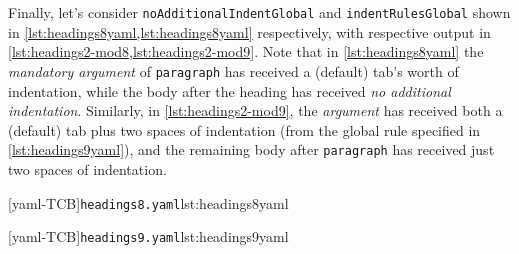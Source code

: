 	Finally, let's consider \texttt{noAdditionalIndentGlobal} and \texttt{indentRulesGlobal} shown in \cref{lst:headings8yaml,lst:headings8yaml}
	respectively, with respective output in \cref{lst:headings2-mod8,lst:headings2-mod9}. Note that in \cref{lst:headings8yaml} the
	\emph{mandatory argument} of \texttt{paragraph} has received a (default) tab's worth of indentation, while the body after the
	heading has received \emph{no additional indentation}. Similarly, in \cref{lst:headings2-mod9}, the \emph{argument} has received both a
	(default) tab plus two spaces of indentation (from the global rule specified in \cref{lst:headings9yaml}), and the remaining body
	after \texttt{paragraph} has received just two spaces of indentation.

	\begin{minipage}{.45\textwidth}
	\end{minipage}%
	\hfill
	\begin{minipage}{.45\textwidth}
		[yaml-TCB]{\texttt{headings8.yaml}}{lst:headings8yaml}
	\end{minipage}

	\begin{minipage}{.45\textwidth}
	\end{minipage}%
	\hfill
	\begin{minipage}{.45\textwidth}
		[yaml-TCB]{\texttt{headings9.yaml}}{lst:headings9yaml}
	\end{minipage}
